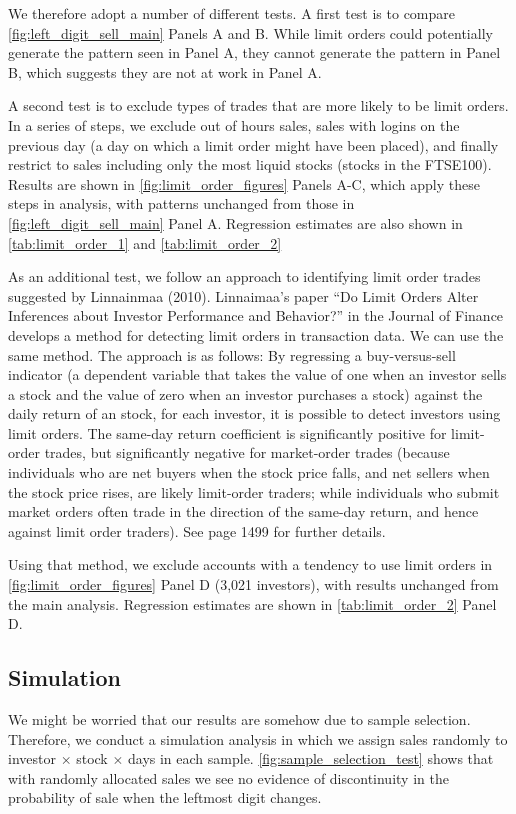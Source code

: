 We therefore adopt a number of different tests. A first test is to compare \ref{fig:left_digit_sell_main} Panels A and B. While limit orders could potentially generate the pattern seen in Panel A, they cannot generate the pattern in Panel B, which suggests they are not at work in Panel A.

A second test is to exclude types of trades that are more likely to be limit orders. In a series of steps, we exclude out of hours sales, sales with logins on the previous day (a day on which a limit order might have been placed), and finally restrict to sales including only the most liquid stocks (stocks in the FTSE100). Results are shown in \ref{fig:limit_order_figures} Panels A-C, which apply these steps in analysis, with patterns unchanged from those in \ref{fig:left_digit_sell_main} Panel A. Regression estimates are also shown in \ref{tab:limit_order_1} and \ref{tab:limit_order_2}

As an additional test, we follow an approach to identifying limit order trades suggested by Linnainmaa (2010). Linnaimaa's paper ``Do Limit Orders Alter Inferences about Investor Performance and Behavior?'' in the Journal of Finance develops a method for detecting limit orders in transaction data. We can use the same method. The approach is as follows: By regressing a buy-versus-sell indicator (a dependent variable that takes the value of one when an investor sells a stock and the value of zero when an investor purchases a stock) against the daily return of an stock, for each investor, it is possible to detect investors using limit orders. The same-day return coefficient is significantly positive for limit-order trades, but significantly negative for market-order trades (because individuals who are net buyers when the stock price falls, and net sellers when the stock price rises, are likely limit-order traders; while individuals who submit market orders often trade in the direction of the same-day return, and hence against limit order traders). See page 1499 for further details.

Using that method, we exclude accounts with a tendency to use limit orders in \ref{fig:limit_order_figures} Panel D (3,021 investors), with results unchanged from the main analysis. Regression estimates are shown in \ref{tab:limit_order_2} Panel D.

\subsection{Simulation}
We might be worried that our results are somehow due to sample selection. Therefore, we conduct a simulation analysis in which we assign sales randomly to investor $\times$ stock $\times$ days in each sample. \ref{fig:sample_selection_test} shows that with randomly allocated sales we see no evidence of discontinuity in the probability of sale when the leftmost digit changes.

